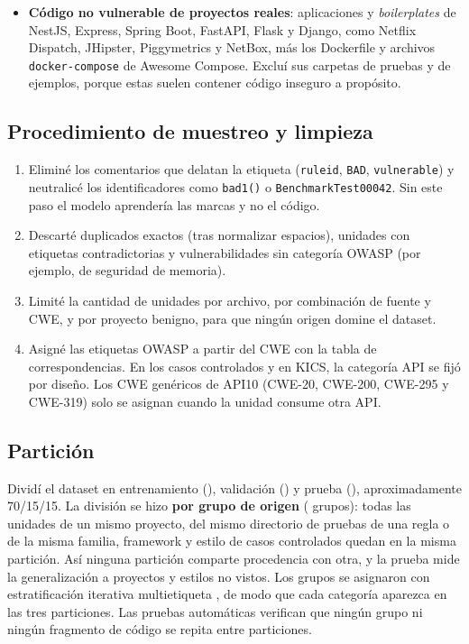 \documentclass[12pt,a4paper]{article}
\newcommand{\cod}[1]{\texttt{#1}}
\begin{document}
\begin{itemize}
  \item \textbf{Código no vulnerable de \nBenignos{} proyectos reales}: aplicaciones y \emph{boilerplates} de NestJS, Express, Spring Boot, FastAPI, Flask y Django, como Netflix Dispatch, JHipster, Piggymetrics y NetBox, más los Dockerfile y archivos \cod{docker-compose} de Awesome Compose. Excluí sus carpetas de pruebas y de ejemplos, porque estas suelen contener código inseguro a propósito.
\end{itemize}

\subsection{Procedimiento de muestreo y limpieza}
\begin{enumerate}
  \item Eliminé los comentarios que delatan la etiqueta (\cod{ruleid}, \cod{BAD}, \cod{vulnerable}) y neutralicé los identificadores como \cod{bad1()} o \cod{BenchmarkTest00042}. Sin este paso el modelo aprendería las marcas y no el código.
  \item Descarté duplicados exactos (tras normalizar espacios), unidades con etiquetas contradictorias y vulnerabilidades sin categoría OWASP (por ejemplo, de seguridad de memoria).
  \item Limité la cantidad de unidades por archivo, por combinación de fuente y CWE, y por proyecto benigno, para que ningún origen domine el dataset.
  \item Asigné las etiquetas OWASP a partir del CWE con la tabla de correspondencias. En los casos controlados y en KICS, la categoría API se fijó por diseño. Los CWE genéricos de API10 (CWE-20, CWE-200, CWE-295 y CWE-319) solo se asignan cuando la unidad consume otra API.
\end{enumerate}

\subsection{Partición}
Dividí el dataset en entrenamiento (\nEntrenamiento{}), validación (\nValidacion{}) y prueba (\nPrueba{}), aproximadamente 70/15/15. La división se hizo \textbf{por grupo de origen} (\nGrupos{} grupos): todas las unidades de un mismo proyecto, del mismo directorio de pruebas de una regla o de la misma familia, framework y estilo de casos controlados quedan en la misma partición. Así ninguna partición comparte procedencia con otra, y la prueba mide la generalización a proyectos y estilos no vistos. Los grupos se asignaron con estratificación iterativa multietiqueta \cite{sechidis}, de modo que cada categoría aparezca en las tres particiones. Las pruebas automáticas verifican que ningún grupo ni ningún fragmento de código se repita entre particiones.
\end{document}
